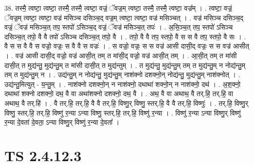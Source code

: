 \documentclass[17pt]{extarticle}
\begin{document}
38. तस्मै॒ त्वष्टा॒ त्वष्टा॒ तस्मै॒ तस्मै॒ त्वष्टा॒ वज्रं॒ ॅवज्र॒म् त्वष्टा॒ तस्मै॒ तस्मै॒ त्वष्टा॒ वज्र᳚म् । . त्वष्टा॒ वज्रं॒ ॅवज्र॒म् त्वष्टा॒ त्वष्टा॒ वज्र॑ मसिञ्च दसिञ्च॒द् वज्र॒म् त्वष्टा॒ त्वष्टा॒ वज्र॑ मसिञ्चत् । . वज्र॑ मसिञ्च दसिञ्च॒द् वज्रं॒ ॅवज्र॑ मसिञ्च॒त् तप॒ स्तपो॑ ऽसिञ्च॒द् वज्रं॒ ॅवज्र॑ मसिञ्च॒त् तपः॑ । . अ॒सि॒ञ्च॒त् तप॒ स्तपो॑ ऽसिञ्च दसिञ्च॒त् तपो॒ वै वै तपो॑ ऽसिञ्च दसिञ्च॒त् तपो॒ वै । . तपो॒ वै वै तप॒ स्तपो॒ वै स स वै तप॒ स्तपो॒ वै सः । . वै स स वै वै स वज्रो॒ वज्रः॒ स वै वै स वज्रः॑ । . स वज्रो॒ वज्रः॒ स स वज्र॑ आसी दासी॒द् वज्रः॒ स स वज्र॑ आसीत् । . वज्र॑ आसी दासी॒द् वज्रो॒ वज्र॑ आसी॒त् तम् त मा॑सी॒द् वज्रो॒ वज्र॑ आसी॒त् तम् । . आ॒सी॒त् तम् त मा॑सी दासी॒त् त मुद्य॑न्तु॒ मुद्य॑न्तु॒म् त मा॑सी दासी॒त् त मुद्य॑न्तुम् । . त मुद्य॑न्तु॒ मुद्य॑न्तु॒म् तम् त मुद्य॑न्तु॒म् न नोद्य॑न्तु॒म् तम् त मुद्य॑न्तु॒म् न । . उद्य॑न्तु॒म् न नोद्य॑न्तु॒ मुद्य॑न्तु॒म् नाश॑क्नो दशक्नो॒न् नोद्य॑न्तु॒ मुद्य॑न्तु॒म् नाश॑क्नोत् । . उद्य॑न्तु॒मित्युत् - य॒न्तु॒म् । . नाश॑क्नो दशक्नो॒न् न नाश॑क्नो॒ दथाथा॑ शक्नो॒न् न नाश॑क्नो॒ दथ॑ । . अ॒श॒क्नो॒ दथाथा॑ शक्नो दशक्नो॒ दथ॒ वै वा अथा॑शक्नो दशक्नो॒ दथ॒ वै । . अथ॒ वै वा अथाथ॒ वै तर्.हि॒ तर्.हि॒ वा अथाथ॒ वै तर्.हि॑ । . वै तर्.हि॒ तर्.हि॒ वै वै तर्.हि॒ विष्णु॒र् विष्णु॒ स्तर्.हि॒ वै वै तर्.हि॒ विष्णुः॑ । . तर्.हि॒ विष्णु॒र् विष्णु॒ स्तर्.हि॒ तर्.हि॒ विष्णु॑ र॒न्या ऽन्या विष्णु॒ स्तर्.हि॒ तर्.हि॒ विष्णु॑ र॒न्या । . विष्णु॑ र॒न्या ऽन्या विष्णु॒र् विष्णु॑ र॒न्या दे॒वता॑ दे॒वता॒ ऽन्या विष्णु॒र् विष्णु॑ र॒न्या दे॒वता᳚ । \newline
\pagebreak
{}

\section{ TS 2.4.12.3 }
\end{document}
